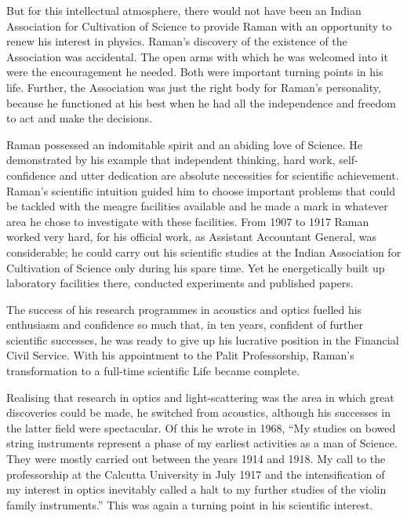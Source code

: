 But for this intellectual atmosphere, there would not have
been an Indian Association for Cultivation of Science to provide
Raman with an opportunity to renew his interest in physics.
Raman's discovery of the existence of the Association was
accidental. The open arms with which he was welcomed into it
were the encouragement he needed. Both were important turning
points in his life. Further, the Association was just the right body
for Raman's personality, because he functioned at his best
when he had all the independence and freedom to act and make
the decisions.

Raman possessed an indomitable spirit and an abiding love
of Science. He demonstrated by his example that independent
thinking, hard work, self-confidence and utter dedication are
absolute necessities for scientific achievement. Raman's scientific
intuition guided him to choose important problems that could
be tackled with the meagre facilities available and he made a mark
in whatever area he chose to investigate with these facilities.
From 1907 to 1917 \hbox{Raman} worked very hard, for his official
work, as Assistant Accountant General, was considerable; he
could carry out his scientific studies at the Indian Association
for Cultivation of Science only during his spare time. Yet he
energetically built up laboratory facilities there, conducted
experiments and published papers.

The success of his research programmes in acoustics and
optics fuelled his enthusiasm and confidence so much that, in
ten years, confident of further scientific successes, he was ready
to give up his lucrative position in the Financial Civil Service.
With his \hbox{appointment} to the Palit Professorship, Raman's
transformation to a full-time scientific Life became complete.

Realising that research in optics and light-scattering was the
area in which great discoveries could be made, he switched from
acoustics, although his successes in the latter field were spectacular.
 Of this he wrote in 1968, ``My studies on bowed string
instruments represent a phase of my earliest activities as a man
of Science. They were mostly carried out between the years 1914
and 1918. My call to the professorship at the Calcutta University
in July 1917 and the intensification of my interest in optics inevitably 
called a halt to my further studies of the violin family instruments.'' This was again a turning point in his scientific interest.


